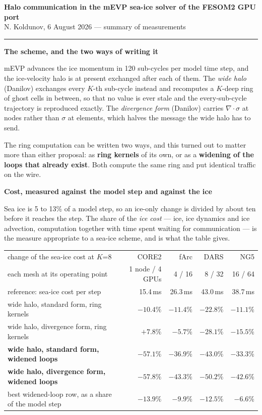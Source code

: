 \documentclass[10pt,a4paper]{article}
\newcommand{\hd}[1]{\vspace{0.2em}\textbf{\large #1}\par\vspace{0.05em}}
\begin{document}
\small

{\Large\bfseries Halo communication in the mEVP sea-ice solver of the FESOM2 GPU port}\\[0.2em]
{\small N. Koldunov, 6 August 2026 --- summary of measurements}

\vspace{0.4em}\hrule\vspace{0.5em}

\hd{The scheme, and the two ways of writing it}

mEVP advances the ice momentum in 120 sub-cycles per model time step, and the ice-velocity halo is
at present exchanged after each of them. The \emph{wide halo} (Danilov) exchanges every $K$-th
sub-cycle instead and recomputes a $K$-deep ring of ghost cells in between, so that no value is
ever stale and the every-sub-cycle trajectory is reproduced exactly. The \emph{divergence form}
(Danilov) carries $\nabla\!\cdot\!\sigma$ at nodes rather than $\sigma$ at elements, which halves
the message the wide halo has to send.

The ring computation can be written two ways, and this turned out to matter more than either
proposal: as \textbf{ring kernels} of its own, or as a \textbf{widening of the loops that already
exist}. Both compute the same ring and put identical traffic on the wire.

\hd{Cost, measured against the model step and against the ice}

Sea ice is 5 to 13\% of a model step, so an ice-only change is divided by about ten before it
reaches the step. The share of the \emph{ice cost} --- ice, ice dynamics and ice advection,
computation together with time spent waiting for communication --- is the measure appropriate to a
sea-ice scheme, and is what the table gives.

\begin{center}\small
\begin{tabular}{@{}lrrrr@{}}
\toprule
change of the sea-ice cost at $K$=8 & CORE2 & fArc & DARS & NG5 \\
each mesh at its operating point & 1 node / 4 GPUs & 4 / 16 & 8 / 32 & 16 / 64 \\
\midrule
reference: sea-ice cost per step                   & 15.4\,ms & 26.3\,ms & 43.0\,ms & 38.7\,ms \\
wide halo, standard form, ring kernels             & $-10.4\%$ & $-11.4\%$ & $-22.8\%$ & $-11.1\%$ \\
wide halo, divergence form, ring kernels           & $+7.8\%$  & $-5.7\%$  & $-28.1\%$ & $-15.5\%$ \\
\textbf{wide halo, standard form, widened loops}   & $\mathbf{-57.1\%}$ & $\mathbf{-36.9\%}$ & $\mathbf{-43.0\%}$ & $\mathbf{-33.3\%}$ \\
\textbf{wide halo, divergence form, widened loops} & $\mathbf{-57.8\%}$ & $\mathbf{-43.3\%}$ & $\mathbf{-50.2\%}$ & $\mathbf{-42.6\%}$ \\
\midrule
best widened-loop row, as a share of the model step & $-13.9\%$ & $-9.9\%$ & $-12.5\%$ & $-6.6\%$ \\
\bottomrule
\end{tabular}
\end{center}
\end{document}
